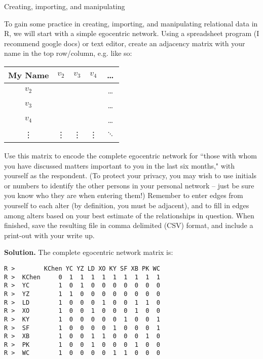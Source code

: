 \documentclass[11pt, oneside]{article}\usepackage[]{graphicx}\usepackage[]{color}
\makeatletter
\newenvironment{kframe}{%
 \def\at@end@of@kframe{}%
 \ifinner\ifhmode%
  \def\at@end@of@kframe{\end{minipage}}%
  \begin{minipage}{\columnwidth}%
 \fi\fi%
 \def\FrameCommand##1{\hskip\@totalleftmargin \hskip-\fboxsep
 \colorbox{shadecolor}{##1}\hskip-\fboxsep
     \hskip-\linewidth \hskip-\@totalleftmargin \hskip\columnwidth}%
 \MakeFramed {\advance\hsize-\width
   \@totalleftmargin\z@ \linewidth\hsize
   \@setminipage}}%
 {\par\unskip\endMakeFramed%
 \at@end@of@kframe}
\newenvironment{knitrout}{}{} %
\newenvironment{solution}{\begin{trivlist} \item \textbf{Solution.}}{\end{trivlist}}
\newenvironment{prob}[2][Problem]{\begin{trivlist}
\item[\hskip \labelsep {\bfseries #1}\hskip \labelsep {\bfseries #2.}]}{\end{trivlist}}
\makeatother
\begin{document}
\begin{prob}{1}
\label{lec12:prob1}
Creating, importing, and manipulating

 \renewcommand{\labelenumi}{(\alph{enumi})}
 \renewcommand{\labelenumii}{\roman{enumii}.}

\begin{enumerate}
\item To gain some practice in creating, importing, and manipulating relational data in R, we will start with a simple egocentric network. Using a spreadsheet program (I recommend google docs) or text editor, create an adjacency matrix with your name in the top row/column, e.g. like so:
\begin{center}
\renewcommand{\tabcolsep}{.25cm}
\begin{tabular}{|c|c|c|c|c|}
\hline
My Name & $v_2$ & $v_3$ & $v_4$ & \dots \\
\hline
$v_2$ 	&		&		&	& \dots \\
\hline 
$v_3$ 	&		&		&	& \dots \\
\hline
$v_4$ 	&		&		&	& \dots \\
\hline
\vdots 	&\vdots	&\vdots	&\vdots & $\ddots$ \\
\hline
\end{tabular}
\end{center}

\noindent
Use this matrix to encode the complete egocentric network for ``those with whom you have discussed matters important to you in the last six months," with yourself as the respondent. (To protect your privacy, you may wish to use initials or numbers to identify the other persons in your personal network -- just be sure you know who they are when entering them!) Remember to enter edges from yourself to each alter (by definition, you must be adjacent), and to fill in edges among alters based on your best estimate of the relationships in question. When finished, save the resulting file in comma delimited (CSV) format, and include a print-out with your write up.

\begin{solution}
The complete egocentric network matrix is:
\begin{knitrout}
\color{fgcolor}\begin{kframe}
\begin{verbatim}
R >        KChen YC YZ LD XO KY SF XB PK WC
R >  KChen     0  1  1  1  1  1  1  1  1  1
R >  YC        1  0  1  0  0  0  0  0  0  0
R >  YZ        1  1  0  0  0  0  0  0  0  0
R >  LD        1  0  0  0  1  0  0  1  1  0
R >  XO        1  0  0  1  0  0  0  1  0  0
R >  KY        1  0  0  0  0  0  1  0  0  1
R >  SF        1  0  0  0  0  1  0  0  0  1
R >  XB        1  0  0  1  1  0  0  0  1  0
R >  PK        1  0  0  1  0  0  0  1  0  0
R >  WC        1  0  0  0  0  1  1  0  0  0
\end{verbatim}
\end{kframe}
\end{knitrout}
\end{solution}



\end{enumerate}
\end{prob}
\end{document}
